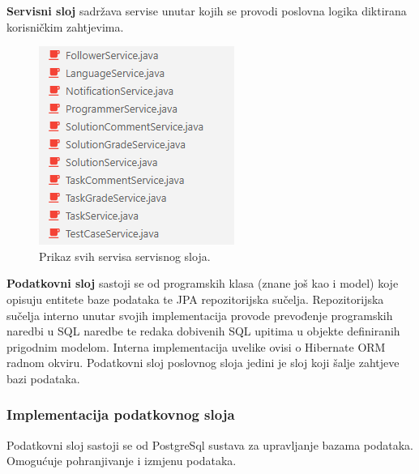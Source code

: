 \documentclass[times, utf8, zavrsni, numeric]{fer}
\begin{document}
	 		\textbf{Servisni sloj} sadržava servise unutar kojih se provodi poslovna logika diktirana korisničkim zahtjevima.
	 		\begin{figure}[H]
	 			\centering
	 			\includegraphics[scale=0.75]{pictures/prikazi/Services.png}
	 			\caption{Prikaz svih servisa servisnog sloja.}
	 			\label{fig:services}
	 		\end{figure}
 		
	 		\textbf{Podatkovni sloj} sastoji se od programskih klasa (znane još kao i model) koje opisuju entitete baze podataka te JPA repozitorijska  sučelja. Repozitorijska sučelja interno unutar svojih implementacija provode prevođenje programskih naredbi u SQL naredbe te redaka dobivenih SQL upitima u objekte definiranih prigodnim modelom. Interna implementacija uvelike ovisi o Hibernate ORM radnom okviru. Podatkovni sloj poslovnog sloja jedini je sloj koji šalje zahtjeve bazi podataka.
			
			\subsubsection{Implementacija podatkovnog sloja}
			Podatkovni sloj sastoji se od PostgreSql sustava za upravljanje bazama podataka. Omogućuje pohranjivanje i izmjenu podataka.
			
\end{document}
